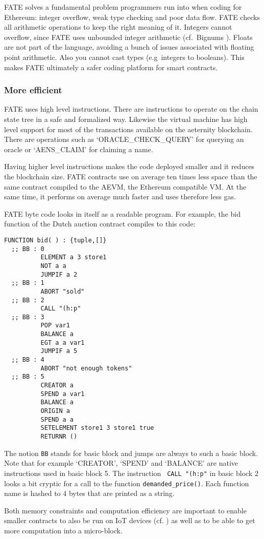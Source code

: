 FATE solves a fundamental problem programmers run into when coding for
Ethereum: integer overflow, weak type checking and poor data
flow. FATE checks all arithmetic operations to keep the right meaning
of it. Integers cannot overflow, since FATE uses unbounded integer
arithmetic (cf.\ Bignums \cite{serpette1989bignum}). Floats are not
part of the language, avoiding a bunch of issues associated with
floating point arithmetic. Also you cannot cast types (e.g\ integers to booleans). This makes
FATE ultimately a safer coding platform for smart contracts.

\subsubsection{More efficient}

FATE uses high level instructions. There are instructions to operate
on the chain state tree in a safe and formalized way. Likewise the
virtual machine has high level support for most of the transactions
available on the aeternity blockchain. There are operations such as
`ORACLE\_CHECK\_QUERY' for querying an oracle or `AENS\_CLAIM' for
claiming a name.

Having higher level instructions makes the code
deployed smaller and it reduces the blockchain size. FATE contracts
use on average ten times less space than the same contract compiled to
the AEVM, the Ethereum compatible VM. At the same time, it performs on
average much faster and uses therefore less gas.

FATE byte code looks in itself as a readable program. For example,
the bid function of the Dutch auction contract compiles to
this code:

\begin{verbatim}
FUNCTION bid( ) : {tuple,[]}
  ;; BB : 0
          ELEMENT a 3 store1
          NOT a a
          JUMPIF a 2
  ;; BB : 1
          ABORT "sold"
  ;; BB : 2
          CALL "(h:p"
  ;; BB : 3
          POP var1
          BALANCE a
          EGT a a var1
          JUMPIF a 5
  ;; BB : 4
          ABORT "not enough tokens"
  ;; BB : 5
          CREATOR a
          SPEND a var1
          BALANCE a
          ORIGIN a
          SPEND a a
          SETELEMENT store1 3 store1 true
          RETURNR ()
\end{verbatim}

The notion \verb+BB+ stands for basic block and jumps are always to
such a basic block. Note that for example `CREATOR', `SPEND' and
`BALANCE' are native instructions used in basic block 5. The
instruction \verb+ CALL "(h:p"+ in basic block 2 looks a bit cryptic for a call to  the
function \verb+demanded_price()+. Each function name is hashed to 4
bytes that are printed as a string.

Both memory constraints and computation efficiency are important to
enable smaller contracts to also be run on IoT devices
(cf. \cite{ellul2018alkylvm}) as well as to be able to get more
computation into a micro-block.

